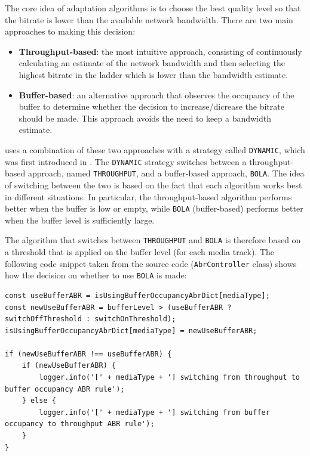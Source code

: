The core idea of adaptation algorithms is to choose the best quality level so that the bitrate is lower than the available network bandwidth. There are two main approaches to making this decision:

\begin{itemize}
    \item \textbf{Throughput-based}: the most intuitive approach, consisting of continuously calculating an estimate of the network bandwidth and then selecting the highest bitrate in the ladder which is lower than the bandwidth estimate.
    \item \textbf{Buffer-based}: an alternative approach that observes the occupancy of the buffer to determine whether the decision to increase/dicrease the bitrate should be made. This approach avoids the need to keep a bandwidth estimate.
\end{itemize}

\dashjs{} uses a combination of these two approaches with a strategy called \texttt{DYNAMIC}, which was first introduced in \cite{dashjs_dynamic}. The \texttt{DYNAMIC} strategy switches between a throughput-based approach, named \texttt{THROUGHPUT}, and a buffer-based approach, \texttt{BOLA}.\cite{bola} The idea of switching between the two is based on the fact that each algorithm works best in different situations. In particular, the throughput-based algorithm performs better when the buffer is low or empty, while \texttt{BOLA} (buffer-based) performs better when the buffer level is sufficiently large.

The algorithm that switches between \texttt{THROUGHPUT} and \texttt{BOLA} is therefore based on a threshold that is applied on the buffer level (for each media track). The following code snippet taken from the \dashjs{} source code (\texttt{AbrController} class) shows how the decision on whether to use \texttt{BOLA} is made:

\begin{verbatim}
const useBufferABR = isUsingBufferOccupancyAbrDict[mediaType];
const newUseBufferABR = bufferLevel > (useBufferABR ? switchOffThreshold : switchOnThreshold);
isUsingBufferOccupancyAbrDict[mediaType] = newUseBufferABR;

if (newUseBufferABR !== useBufferABR) {
    if (newUseBufferABR) {
        logger.info('[' + mediaType + '] switching from throughput to buffer occupancy ABR rule');
    } else {
        logger.info('[' + mediaType + '] switching from buffer occupancy to throughput ABR rule');
    }
}
\end{verbatim}

